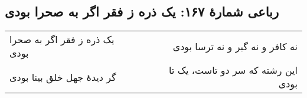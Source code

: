 \begin{center}
\section*{رباعی شمارهٔ ۱۶۷: یک ذره ز فقر اگر به صحرا بودی}
\label{sec:167}
\begin{longtable}{l p{0.5cm} r}
یک ذره ز فقر اگر به صحرا بودی
&&
نه کافر و نه گبر و نه ترسا بودی
\\
گر دیدهٔ جهل خلق بینا بودی
&&
این رشته که سر دو تاست، یک تا بودی
\\
\end{longtable}
\end{center}
